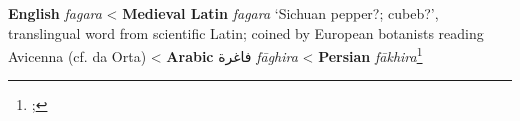 \begin{etymology}\label{ety:fagara}
\textbf{English} \textit{fagara}
< \textbf{Medieval Latin} \textit{fagara} `Sichuan pepper?; cubeb?', translingual word from scientific Latin; coined by European botanists reading Avicenna (cf. da Orta)
< \textbf{Arabic} {فاغرة} \textit{fāghira}
< \textbf{Persian} \textit{fākhira}\footnote{; }
\end{etymology}